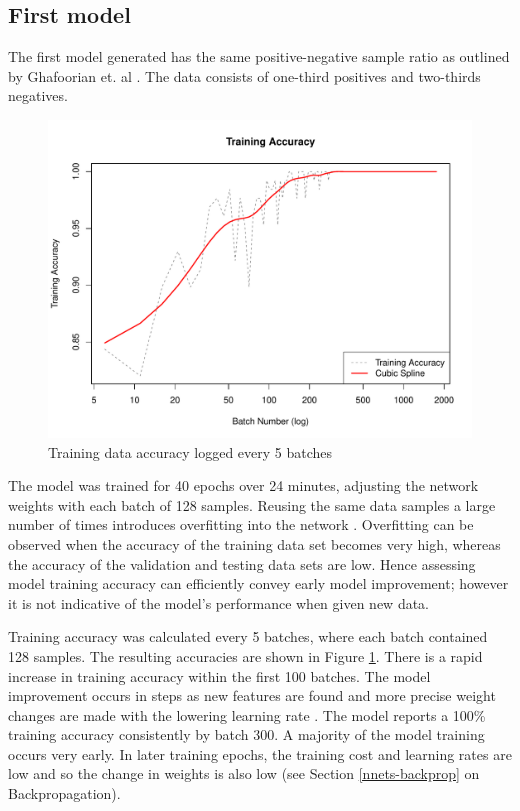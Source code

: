 \subsection*{First model}

The first model generated has the same positive-negative sample ratio as outlined by Ghafoorian et. al \cite{GhafoorianM.2017Dml3}. The data consists of one-third positives and two-thirds negatives.

\begin{figure}[hb]
	\centering
	\includegraphics[width=\textwidth]{Images/7_train_acc4.pdf}
	\caption{Training data accuracy logged every 5 batches}
	\label{results-train-acc4-fig}
\end{figure}

The model was trained for 40 epochs over 24 minutes, adjusting the network weights with each batch of 128 samples. Reusing the same data samples a large number of times introduces overfitting into the network \cite{Goodfellow-et-al-2016}. Overfitting can be observed when the accuracy of the training data set becomes very high, whereas the accuracy of the validation and testing data sets are low. Hence assessing model training accuracy can efficiently convey early model improvement; however it is not indicative of the model's performance when given new data.

Training accuracy was calculated every 5 batches, where each batch contained 128 samples. The resulting accuracies are shown in Figure \ref{results-train-acc4-fig}. There is a rapid increase in training accuracy within the first 100 batches. The model improvement occurs in steps as new features are found and more precise weight changes are made with the lowering learning rate \cite{Folly2009, Nielson2015}. The model reports a 100\% training accuracy consistently by batch 300. A majority of the model training occurs very early. In later training epochs, the training cost and learning rates are low and so the change in weights is also low (see Section \ref{nnets-backprop} on Backpropagation).

